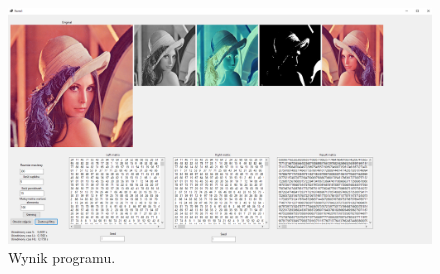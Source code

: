 \documentclass{report}
\begin{document}
\begin{figure}[H]%
	\centering
	\includegraphics[scale=0.35]{zdj/main}
	\caption{Wynik programu.}
\end{figure}
\end{document}
